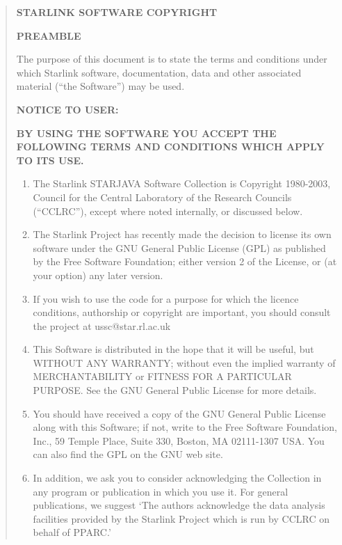 \documentclass[twoside,11pt]{article}
\newcommand{\htmladdnormallink}[2]{#1}
\renewcommand{\_}{\texttt{\symbol{95}}}
\newcommand{\latexonlysmall}{\small}
\newcommand{\latexonlysmall}{}
\begin{document}
\begin{quote}
\latexonlysmall
\begin{center}\textbf{STARLINK SOFTWARE COPYRIGHT}\end{center}
 
\textbf{PREAMBLE}

The purpose of this document is to state the terms and conditions
under which Starlink software, documentation, data and other associated
material (``the Software'') may be used.

\par 
\textbf{NOTICE TO USER:}
\par 
\textbf{BY USING THE SOFTWARE YOU ACCEPT THE FOLLOWING TERMS AND CONDITIONS
WHICH APPLY TO ITS USE.}
 
\begin{enumerate}

\item The Starlink STARJAVA Software Collection is Copyright 1980-2003, Council 
 for the Central Laboratory of the Research Councils (``CCLRC''), 
 except where noted internally, or discussed below.

\item The Starlink Project has recently made the decision to license its
 own software under the GNU General Public License (GPL) as published 
 by the Free Software Foundation; either version 2 of the License, 
 or (at your option) any later version.

\item If you wish to use the code for a purpose for which the licence
 conditions, authorship or copyright are important, you should 
 consult the project at \htmladdnormallink{ussc@star.rl.ac.uk}{mailto:ussc@star.rl.ac.uk}

\item This Software is distributed in the hope that it will be useful, but 
 WITHOUT ANY WARRANTY; without even the implied warranty of 
 MERCHANTABILITY or FITNESS FOR A PARTICULAR PURPOSE. See the GNU General
 Public License for more details.

\item You should have received a copy of the GNU General Public License along 
 with this Software; if not, write to the Free Software Foundation, Inc., 
 59 Temple Place, Suite 330, Boston, MA 02111-1307 USA. You can also find 
 the GPL on the GNU web site.
 
\item In addition, we ask you to consider acknowledging the Collection in any
 program or publication in which you use it.  For general publications,
 we suggest `The authors acknowledge the data analysis facilities
 provided by the Starlink Project which is run by CCLRC on behalf
 of PPARC.'
\end{enumerate}
\end{quote}
\end{document}
